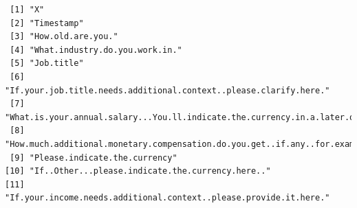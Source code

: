\documentclass[
  letterpaper,
  DIV=11,
  numbers=noendperiod]{scrartcl}
\begin{document}
\begin{verbatim}
 [1] "X"                                                                                                                                                                                                                                   
 [2] "Timestamp"                                                                                                                                                                                                                           
 [3] "How.old.are.you."                                                                                                                                                                                                                    
 [4] "What.industry.do.you.work.in."                                                                                                                                                                                                       
 [5] "Job.title"                                                                                                                                                                                                                           
 [6] "If.your.job.title.needs.additional.context..please.clarify.here."                                                                                                                                                                    
 [7] "What.is.your.annual.salary...You.ll.indicate.the.currency.in.a.later.question..If.you.are.part.time.or.hourly..please.enter.an.annualized.equivalent....what.you.would.earn.if.you.worked.the.job.40.hours.a.week..52.weeks.a.year.."
 [8] "How.much.additional.monetary.compensation.do.you.get..if.any..for.example..bonuses.or.overtime.in.an.average.year...Please.only.include.monetary.compensation.here..not.the.value.of.benefits."                                      
 [9] "Please.indicate.the.currency"                                                                                                                                                                                                        
[10] "If..Other...please.indicate.the.currency.here.."                                                                                                                                                                                     
[11] "If.your.income.needs.additional.context..please.provide.it.here."                                                                                                                                                                    

\end{verbatim}
\end{document}
